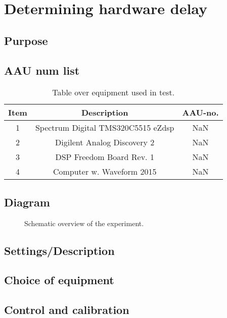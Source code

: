 \section{Determining hardware delay} \label{sec:HardwareDelay}

\subsection{Purpose}


\subsection{AAU num list}
\begin{table}[H]
	\centering
	\begin{tabular}{ c c c } \toprule
		{Item}	& {Description} 						& {AAU-no}. \\ \bottomrule 
		1	&	Spectrum Digital TMS320C5515 eZdsp	& NaN	\\
		2	&	Digilent Analog Discovery 2	& NaN		\\
		3	&	DSP Freedom Board Rev. 1 & NaN		\\
		4	&	Computer w. Waveform 2015					& NaN		\\
		\bottomrule
	\end{tabular}
	\caption{Table over equipment used in test.}
	\label{tab:MeasDelayTable}
\end{table}

\subsection{Diagram}

\begin{figure}[H]
	\centering
	
	\caption{Schematic overview of the experiment.}
	\label{fig:SchematicDelayExperiment}
\end{figure}


\subsection{Settings/Description}

\subsection{Choice of equipment}

\subsection{Control and calibration}

